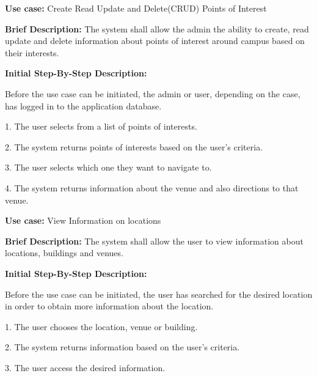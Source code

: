 \documentclass{article}
\begin{document}
\begin{flushleft}
    \textbf{Use case:} Create Read Update and Delete(CRUD) Points of Interest  
    \newline
    	
    \textbf{Brief Description:}
    \newline
    The system shall allow the admin the ability to create, read update and delete information about points of interest around campus based on their interests.
    \newline
    
    \textbf{Initial Step-By-Step Description:}
    
    Before the use case can be initiated, the admin or user, depending on the case, has logged in to the application database. 
	\newline    
	
1. The user selects from a list of points of interests.

2. The system returns points of interests based on the user's criteria.

3. The user selects which one they want to navigate to.

4. The system returns information about the venue and also directions to that venue.

\end{flushleft}

\begin{flushleft}
    \textbf{Use case:} View Information on locations  
    \newline
    	
    \textbf{Brief Description:}
    \newline
    The system shall allow the user to view information about locations, buildings and venues.
    \newline
    
    \textbf{Initial Step-By-Step Description:}
    
    Before the use case can be initiated, the user has searched for the desired location in order to obtain more information about the location.
	\newline    
	
1. The user chooses the location, venue or building.

2. The system returns information based on the user's criteria. 

3. The user access the desired information.

\end{flushleft}
\end{document}
